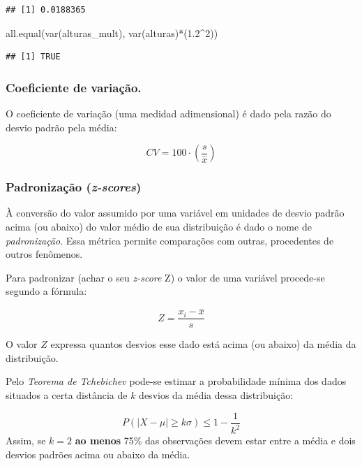 \documentclass[
]{book}
\newenvironment{Shaded}{\begin{snugshade}}{\end{snugshade}}
\newcommand{\DecValTok}[1]{\textcolor[rgb]{0.00,0.00,0.81}{#1}}
\newcommand{\FloatTok}[1]{\textcolor[rgb]{0.00,0.00,0.81}{#1}}
\newcommand{\FunctionTok}[1]{\textcolor[rgb]{0.00,0.00,0.00}{#1}}
\newcommand{\NormalTok}[1]{#1}
\newcommand{\SpecialCharTok}[1]{\textcolor[rgb]{0.00,0.00,0.00}{#1}}
\begin{document}
\begin{verbatim}
## [1] 0.0188365
\end{verbatim}

\begin{Shaded}
\begin{Highlighting}[]
\FunctionTok{all.equal}\NormalTok{(}\FunctionTok{var}\NormalTok{(alturas\_mult), }\FunctionTok{var}\NormalTok{(alturas)}\SpecialCharTok{*}\NormalTok{(}\FloatTok{1.2}\SpecialCharTok{\^{}}\DecValTok{2}\NormalTok{)) }
\end{Highlighting}
\end{Shaded}

\begin{verbatim}
## [1] TRUE
\end{verbatim}

\hypertarget{coeficiente-de-variauxe7uxe3o.}{%
\subsubsection{Coeficiente de variação.}\label{coeficiente-de-variauxe7uxe3o.}}

O coeficiente de variação (uma medidad adimensional) é dado pela razão do desvio padrão pela média:

\[
CV= 100\cdot(\frac{s}{\stackrel{-}{x}})
\]

\hypertarget{padronizauxe7uxe3o-z-scores}{%
\subsubsection{\texorpdfstring{Padronização (\emph{z-scores})}{Padronização (z-scores)}}\label{padronizauxe7uxe3o-z-scores}}

À conversão do valor assumido por uma variável em unidades de desvio padrão acima (ou abaixo) do valor médio de sua distribuição é dado o nome de \emph{padronização}. Essa métrica permite comparações com outras, procedentes de outros fenômenos.

Para padronizar (achar o seu \emph{z-score} Z) o valor de uma variável procede-se segundo a fórmula:

\[
Z=\frac{x_{i} - \stackrel{-}{x}}{s}
\]

O valor \(Z\) expressa quantos desvios esse dado está acima (ou abaixo) da média da distribuição.

Pelo \emph{Teorema de Tchebichev} pode-se estimar a probabilidade mínima dos dados situados a certa distância de \(k\) desvios da média dessa distribuição:

\[
P(|X-\mu|\ge k\sigma) \leq 1 - \frac{1}{k^{2}}
\]
Assim, se \(k=2\) \textbf{ao menos} 75\% das observações devem estar entre a média e dois desvios padrões acima ou abaixo da média.
\end{document}
